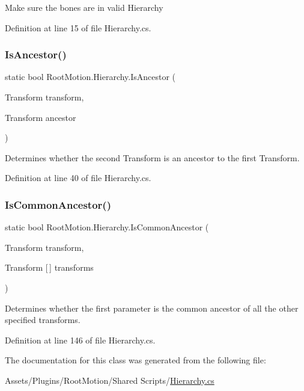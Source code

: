 Make sure the bones are in valid Hierarchy 



Definition at line 15 of file Hierarchy.\+cs.

\mbox{\label{class_root_motion_1_1_hierarchy_a0b1ef51ffa69b2b47e62ff511dbbe7dc}} 
\subsubsection{\texorpdfstring{Is\+Ancestor()}{IsAncestor()}}
{\footnotesize\ttfamily static bool Root\+Motion.\+Hierarchy.\+Is\+Ancestor (\begin{DoxyParamCaption}\item[{Transform}]{transform,  }\item[{Transform}]{ancestor }\end{DoxyParamCaption})\hspace{0.3cm}{\ttfamily [static]}}



Determines whether the second Transform is an ancestor to the first Transform. 



Definition at line 40 of file Hierarchy.\+cs.

\mbox{\label{class_root_motion_1_1_hierarchy_af09d1c35c2a5c12aa3704f9e5403b355}} 
\subsubsection{\texorpdfstring{Is\+Common\+Ancestor()}{IsCommonAncestor()}}
{\footnotesize\ttfamily static bool Root\+Motion.\+Hierarchy.\+Is\+Common\+Ancestor (\begin{DoxyParamCaption}\item[{Transform}]{transform,  }\item[{Transform \mbox{[}$\,$\mbox{]}}]{transforms }\end{DoxyParamCaption})\hspace{0.3cm}{\ttfamily [static]}}



Determines whether the first parameter is the common ancestor of all the other specified transforms. 



Definition at line 146 of file Hierarchy.\+cs.



The documentation for this class was generated from the following file\+:\begin{DoxyCompactItemize}
\item 
Assets/\+Plugins/\+Root\+Motion/\+Shared Scripts/\mbox{\hyperlink{_hierarchy_8cs}{Hierarchy.\+cs}}\end{DoxyCompactItemize}
